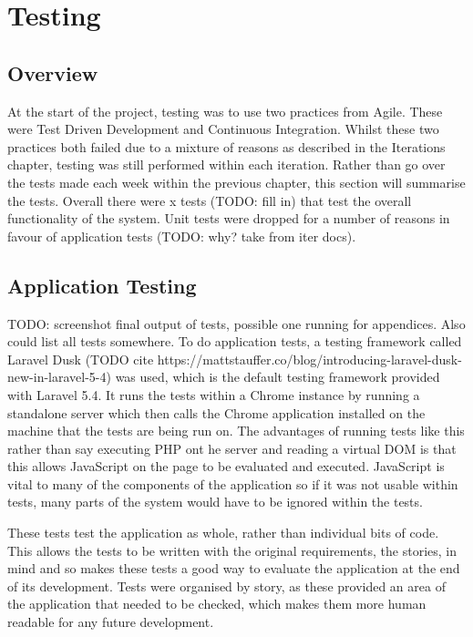 \chapter{Testing}

\section{Overview}
At the start of the project, testing was to use two practices from Agile. These were Test Driven Development and Continuous Integration. Whilst these two practices both failed due to a mixture of reasons as described in the Iterations chapter, testing was still performed within each iteration. Rather than go over the tests made each week within the previous chapter, this section will summarise the tests. Overall there were x tests (TODO: fill in) that test the overall functionality of the system. Unit tests were dropped for a number of reasons in favour of application tests (TODO: why? take from iter docs).

\section{Application Testing}
TODO: screenshot final output of tests, possible one running for appendices. Also could list all tests somewhere.
To do application tests, a testing framework called Laravel Dusk (TODO cite https://mattstauffer.co/blog/introducing-laravel-dusk-new-in-laravel-5-4) was used, which is the default testing framework provided with Laravel 5.4. It runs the tests within a Chrome instance by running a standalone server which then calls the Chrome application installed on the machine that the tests are being run on. The advantages of running tests like this rather than say executing PHP ont he server and reading a virtual DOM is that this allows JavaScript on the page to be evaluated and executed. JavaScript is vital to many of the components of the application so if it was not usable within tests, many parts of the system would have to be ignored within the tests.

These tests test the application as whole, rather than individual bits of code. This allows the tests to be written with the original requirements, the stories, in mind and so makes these tests a good way to evaluate the application at the end of its development. Tests were organised by story, as these provided an area of the application that needed to be checked, which makes them more human readable for any future development.

